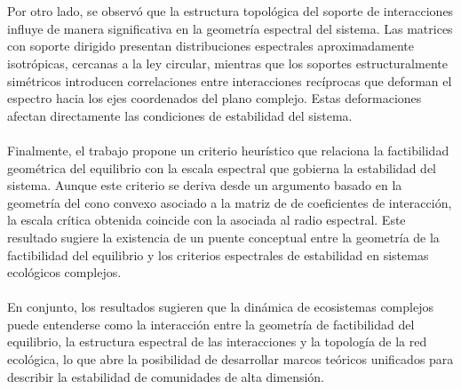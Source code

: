 \\
\\
Por otro lado, se observó que la estructura topológica del soporte de interacciones influye de manera significativa en la geometría espectral del sistema. Las matrices con soporte dirigido presentan distribuciones espectrales aproximadamente isotrópicas, cercanas a la ley circular, mientras que los soportes estructuralmente simétricos introducen correlaciones entre interacciones recíprocas que deforman el espectro hacia los ejes coordenados del plano complejo. Estas deformaciones afectan directamente las condiciones de estabilidad del sistema.
\\
\\
Finalmente, el trabajo propone un criterio heurístico que relaciona la factibilidad geométrica del equilibrio con la escala espectral que gobierna la estabilidad del sistema. Aunque este criterio se deriva desde un argumento basado en la geometría del cono convexo asociado a la matriz de de coeficientes de interacción, la escala crítica obtenida coincide con la asociada al radio espectral. Este resultado sugiere la existencia de un puente conceptual entre la geometría de la factibilidad del equilibrio y los criterios espectrales de estabilidad en sistemas ecológicos complejos.
\\
\\
En conjunto, los resultados sugieren que la dinámica de ecosistemas complejos puede entenderse como la interacción entre la geometría de factibilidad del equilibrio, la estructura espectral de las interacciones y la topología de la red ecológica, lo que abre la posibilidad de desarrollar marcos teóricos unificados para describir la estabilidad de comunidades de alta dimensión.

